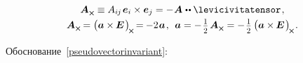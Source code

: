 \begin{otherlanguage}{russian}
\nopagebreak\vspace{-0.15em}\begin{equation}\label{pseudovectorinvariant}
\begin{array}{c}
\bm{A}_{\Xcompanion} \equiv A_{i\hspace{-0.1ex}j} \hspace{.25ex} \bm{e}_i \times \bm{e}_j = - \hspace{.1ex} \bm{A} \hspace{.1ex} \dotdotp \levicivitatensor
\hspace{.2ex}, \\[.3em]
%
\bm{A}_{\Xcompanion} \hspace{-0.16ex} = \left(^{\mathstrut} \hspace{-0.1ex} \bm{a} \times\hspace{-0.1ex} \UnitDyad \hspace{.2ex} \right)_{\hspace{-0.25ex}\Xcompanion} \hspace{-0.25ex} = \hspace{-0.12ex}
- 2 \hspace{.16ex} \bm{a} \hspace{.2ex},\:\:
\bm{a} = - \hspace{.2ex} \smalldisplaystyleonehalf \hspace{.25ex} \bm{A}_{\Xcompanion} = - \hspace{.2ex} \smalldisplaystyleonehalf \left(^{\mathstrut} \hspace{-0.1ex} \bm{a} \times\hspace{-0.1ex} \UnitDyad \hspace{.2ex} \right)_{\hspace{-0.25ex}\Xcompanion} \hspace{-0.2ex}.
\end{array}
\end{equation}

Обоснование~\eqref{pseudovectorinvariant}:


\end{otherlanguage}
